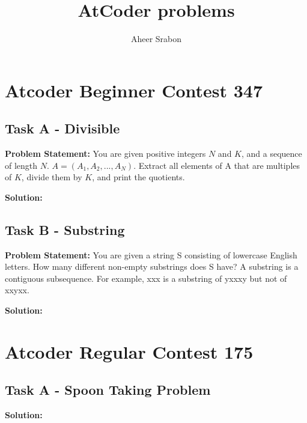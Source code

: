 

\title{AtCoder problems}
\author{Aheer Srabon}
\date{}


	\maketitle

	\section{Atcoder Beginner Contest 347}
	\subsection{Task A - Divisible}
	\noindent \textbf{Problem Statement: } You are given positive
	integers $ N $ and $ K $, and a sequence of length $ N $.
	$ A = (A_1, A_2,...,A_N) $. Extract all elements of A that are
	multiples of $ K $, divide them by $ K $, and print the
	quotients.

	\vspace{1cm}

	\noindent \textbf{Solution: }
	

	\subsection{Task B - Substring}
	\noindent \textbf{Problem Statement: } You are given a string 
	S consisting of lowercase English letters. How many different 
	non-empty substrings does S have?
	A substring is a contiguous subsequence.
	For example, xxx is a substring of yxxxy but not of xxyxx.

	\vspace{1cm}

	\noindent \textbf{Solution: }
	

	\section{Atcoder Regular Contest 175}
	\subsection{Task A - Spoon Taking Problem}

	\noindent \textbf{Solution: }
	




